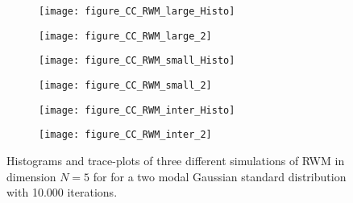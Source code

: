 \begin{figure}%
 \begin{center} 
 
  \begin{subfigure}{.5\textwidth}
    \centering
    \texttt{[image: figure\_CC\_RWM\_large\_Histo]}
  \end{subfigure}%
  \begin{subfigure}{.5\textwidth}
    \centering
    \texttt{[image: figure\_CC\_RWM\_large\_2]}
  \end{subfigure}
  \vspace*{1mm}
  \label{fig:HeuristicHistoPlotRWM-large}
  \vspace*{3mm}
  
  
  \begin{subfigure}{.5\textwidth}
    \centering
    \texttt{[image: figure\_CC\_RWM\_small\_Histo]}
  \end{subfigure}%
  \begin{subfigure}{.5\textwidth}
    \centering
    \texttt{[image: figure\_CC\_RWM\_small\_2]}
  \end{subfigure}
  \vspace*{1mm}
  \label{fig:HeuristicHistoPlotRWM-small}
  \vspace*{3mm}
  
  \begin{subfigure}{.5\textwidth}
    \centering
    \texttt{[image: figure\_CC\_RWM\_inter\_Histo]}
  \end{subfigure}%
  \begin{subfigure}{.5\textwidth}
    \centering
    \texttt{[image: figure\_CC\_RWM\_inter\_2]}
  \end{subfigure}  
  \vspace*{1mm}
  \label{fig:HeuristicHistoPlotRWM-medium}
  
 \end{center}
 
  \caption{Histograms and trace-plots of three different simulations of RWM in dimension $N=5$ for for a two modal Gaussian standard distribution with 10.000 iterations.}
  \label{fig:HeuristicHistoPlotRWM}
\end{figure}



